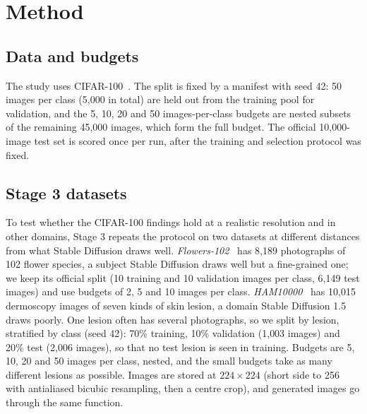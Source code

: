 \section{Method}
\label{sec:method}


\subsection{Data and budgets}
The study uses CIFAR-100~\cite{krizhevsky2009learning}. The split is fixed by a manifest with seed 42: 50 images per class (5,000 in total) are held out from the training pool for validation, and the 5, 10, 20 and 50 images-per-class budgets are nested subsets of the remaining 45,000 images, which form the full budget. The official 10,000-image test set is scored once per run, after the training and selection protocol was fixed.

\subsection{Stage 3 datasets}
\label{sec:method-stage3}
To test whether the CIFAR-100 findings hold at a realistic resolution and in other domains, Stage 3 repeats the
protocol on two datasets at different distances from what Stable Diffusion draws well.
\textit{Flowers-102}~\cite{nilsback2008automated} has 8{,}189 photographs of 102 flower species, a subject Stable
Diffusion draws well but a fine-grained one; we keep its official split (10 training and 10 validation images per
class, 6{,}149 test images) and use budgets of 2, 5 and 10 images per class. \textit{HAM10000}~\cite{tschandl2018ham10000}
has 10{,}015 dermoscopy images of seven kinds of skin lesion, a domain Stable Diffusion 1.5 draws poorly. One
lesion often has several photographs, so we split by lesion, stratified by class (seed 42): 70\% training,
10\% validation (1{,}003 images) and 20\% test (2{,}006 images), so that no test lesion is seen in training.
Budgets are 5, 10, 20 and 50 images per class, nested, and the small budgets take as many different lesions as
possible. Images are stored at $224\times224$ (short side to 256 with antialiased bicubic resampling, then a
centre crop), and generated images go through the same function.

